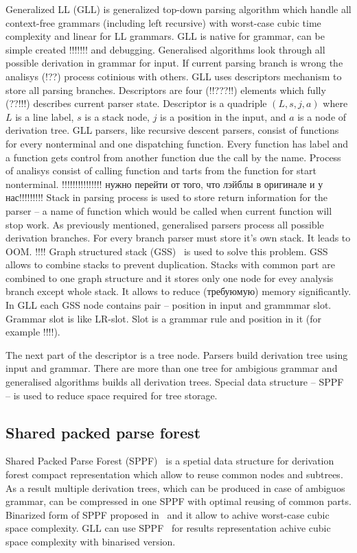 \documentclass{sig-alternate} %
\begin{document}
Generalized LL (GLL) is generalized top-down parsing algorithm which handle all context-free grammars (including left recursive) with worst-case cubic time complexity and linear for LL grammars.
GLL is native for grammar, can be simple created !!!!!!! and debugging. Generalised algorithms look through all possible derivation in grammar for input. If current parsing branch is wrong the analisys (!??) process cotinious with others. 
GLL uses descriptors mechanism to store all parsing branches. Descriptors are four (!!???!!) elements which fully (??!!!) describes current parser state. Descriptor is a quadriple $(L, s, j, a)$ where $L$ is a line label, $s$ is a stack node, $j$ is a position in the input, and $a$ is a node of derivation tree. GLL parsers, like recursive descent parsers, consist of functions for every nonterminal and one dispatching function. Every function has label and a function gets control from another function due the call by the name. Process of analisys consist of calling function and tarts from the function for start nonterminal. !!!!!!!!!!!!!!!  нужно перейти от того, что лэйблы в оригинале и у нас!!!!!!!!!
Stack in parsing process is used to store return information for the parser -- a name of function which would be called when current function will stop work. As previously mentioned, generalised parsers process all possible derivation branches. For every branch parser must store it's own stack. It leads to OOM. !!!!  
Graph structured stack (GSS)~\cite{Tomita} is used to solve this problem. GSS allows to combine stacks to prevent duplication. Stacks with common part are combined to one graph structure and it stores only one node for evey analysis branch except whole stack. It allows to reduce (требуюмую) memory significantly. 
In GLL each GSS node contains pair -- position in input and grammmar slot. Grammar slot is like LR-slot. Slot is a grammar rule and position in it (for example !!!!).

The next part of the descriptor is a tree node. Parsers build derivation tree using input and grammar. There are more than one tree for ambigious grammar and generalised algorithms builds all derivation trees. Special data structure -- SPPF -- is used to reduce space required for tree storage.

\subsection{Shared packed parse forest}

Shared Packed Parse Forest (SPPF)~\cite{SPPF} is a spetial data structure for derivation forest compact representation which allow to reuse common nodes and subtrees.
As a result multiple derivation trees, which can be produced in case of ambiguos grammar, can be compressed in one SPPF with optimal reusing of common parts.  
Binarized form of SPPF proposed in~\cite{brnglr} and it allow to achive worst-case cubic space complexity.
GLL can use SPPF~\cite{gllParsingTree} for results representation achive cubic space complexity with binarised version.
\end{document}
